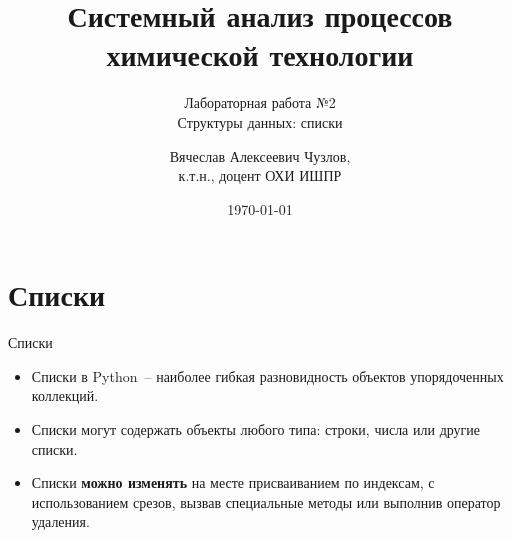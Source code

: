 \documentclass[aspectratio=169, mathserif]{beamer}%
\title{\LARGE{Системный анализ процессов химической технологии}}
\subtitle{Лабораторная работа №2 \\ Структуры данных: списки}
\author[]{Вячеслав Алексеевич Чузлов, \\
к.т.н., доцент ОХИ ИШПР}
\date{\today}
\begin{document}
\newcommand{\pythoninline}[1]{%
	\colorbox{white}{%
		\parbox[b][.6em]{\widthof{\texttt{#1}}}{\texttt{#1}}%
	}%
}


\titleframe%




\section{Списки}
\sectionframe


\begin{frame}[fragile]{Списки}
\scriptsize
\begin{itemize}
\item Списки в Python~-- наиболее гибкая разновидность объектов упорядоченных коллекций. 

\item Списки могут содержать объекты любого типа: строки, числа или другие списки.  

\item Списки \textcolor{extraorange}{\textbf{можно изменять}} на месте присваиванием по индексам, с использованием срезов, вызвав специальные методы или выполнив оператор удаления. 
\end{itemize}


\end{frame}
\end{document}
